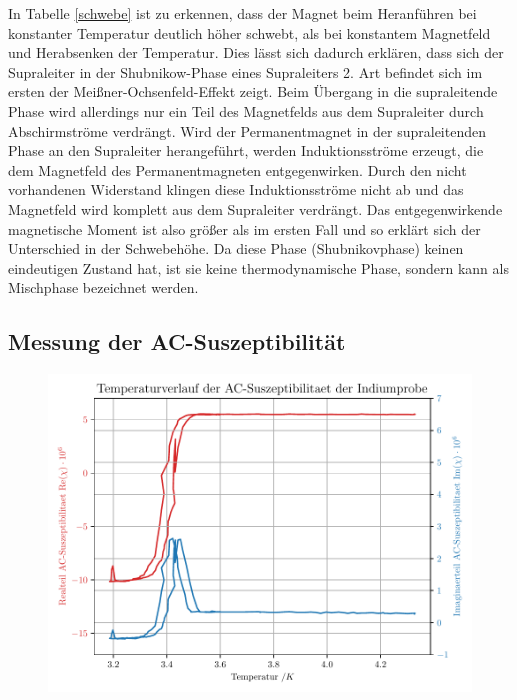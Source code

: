In Tabelle \ref{schwebe} ist zu erkennen, dass der Magnet beim Heranführen bei konstanter Temperatur deutlich höher schwebt, als bei konstantem Magnetfeld und Herabsenken der Temperatur. Dies lässt sich dadurch erklären, dass sich der Supraleiter in der Shubnikow-Phase eines Supraleiters 2. Art befindet sich im ersten der Meißner-Ochsenfeld-Effekt zeigt. Beim Übergang in die supraleitende Phase wird allerdings nur ein Teil des Magnetfelds aus dem Supraleiter durch Abschirmströme verdrängt. Wird der Permanentmagnet in der supraleitenden Phase an den Supraleiter herangeführt, werden Induktionsströme erzeugt, die dem Magnetfeld des Permanentmagneten entgegenwirken. Durch den nicht vorhandenen Widerstand klingen diese Induktionsströme nicht ab und das Magnetfeld wird komplett aus dem Supraleiter verdrängt. Das entgegenwirkende magnetische Moment ist also größer als im ersten Fall und so erklärt sich der Unterschied in der Schwebehöhe. Da diese Phase (Shubnikovphase) keinen eindeutigen Zustand hat, ist sie keine thermodynamische Phase, sondern kann als Mischphase bezeichnet werden.

\subsection{Messung der AC-Suszeptibilität}

\begin{figure}[h]
\includegraphics[width=\textwidth]{Temperaturverlauf_der_AC-Suszeptibilitaet_der_Indiumprobe.pdf}
\label{ac-sus}
\end{figure}

